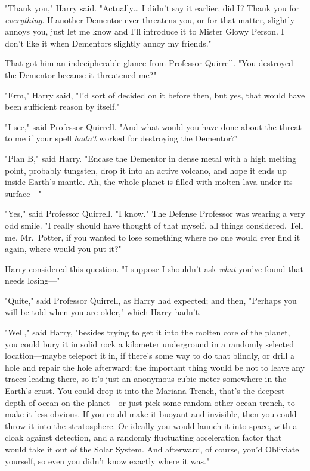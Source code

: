 "Thank you," Harry said. "Actually{\ldots} I didn't say it earlier, did I? 
Thank you for \emph{everything}. If another Dementor ever threatens you, or for 
that matter, slightly annoys you, just let me know and I'll introduce it to 
Mister Glowy Person. I don't like it when Dementors slightly annoy my friends."

That got him an indecipherable glance from Professor Quirrell. "You destroyed 
the Dementor because it threatened me?"

"Erm," Harry said, "I'd sort of decided on it before then, but yes, that would 
have been sufficient reason by itself."

"I see," said Professor Quirrell. "And what would you have done about the 
threat to me if your spell \emph{hadn't} worked for destroying the Dementor?"

"Plan B," said Harry. "Encase the Dementor in dense metal with a high melting 
point, probably tungsten, drop it into an active volcano, and hope it ends up 
inside Earth's mantle. Ah, the whole planet is filled with molten lava under 
its surface---"

"Yes," said Professor Quirrell. "I know." The Defense Professor was wearing a 
very odd smile. "I really should have thought of that myself, all things 
considered. Tell me, Mr.~Potter, if you wanted to lose something where no one 
would ever find it again, where would you put it?"

Harry considered this question. "I suppose I shouldn't ask \emph{what} you've 
found that needs losing---"

"Quite," said Professor Quirrell, as Harry had expected; and then, "Perhaps you 
will be told when you are older," which Harry hadn't.

"Well," said Harry, "besides trying to get it into the molten core of the 
planet, you could bury it in solid rock a kilometer underground in a randomly 
selected location---maybe teleport it in, if there's some way to do that 
blindly, or drill a hole and repair the hole afterward; the important thing 
would be not to leave any traces leading there, so it's just an anonymous cubic 
meter somewhere in the Earth's crust. You could drop it into the Mariana 
Trench, that's the deepest depth of ocean on the planet---or just pick some 
random other ocean trench, to make it less obvious. If you could make it 
buoyant and invisible, then you could throw it into the stratosphere. Or 
ideally you would launch it into space, with a cloak against detection, and a 
randomly fluctuating acceleration factor that would take it out of the Solar 
System. And afterward, of course, you'd Obliviate yourself, so even you didn't 
know exactly where it was."

